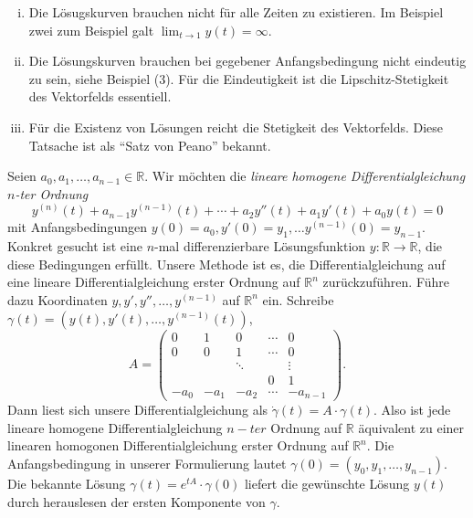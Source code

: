 \documentclass[../main.tex]{subfiles}
\begin{document}
\begin{remarks}
   \leavevmode
   \begin{enumerate}[(i)]
   \item Die Lösugskurven brauchen nicht für alle Zeiten zu existieren.
     Im Beispiel zwei zum Beispiel galt $\lim_{t \to 1} y(t) = \infty$.
   \item Die Lösungskurven brauchen bei gegebener Anfangsbedingung nicht
     eindeutig zu sein, siehe Beispiel (3). Für die
     Eindeutigkeit ist die Lipschitz-Stetigkeit des
     Vektorfelds essentiell.
   \item Für die Existenz von Lösungen reicht
     die Stetigkeit des Vektorfelds. Diese Tatsache
     ist als ``Satz von Peano'' bekannt.
 \end{enumerate}
\end{remarks}

Seien $a_0, a_1, \dots, a_{n-1} \in \mathbb{R}$.
Wir möchten die 
\emph{lineare homogene Differentialgleichung $n$-ter Ordnung}
\[
  y^{(n)}(t) 
  + a_{n-1}y^{(n-1)}(t) 
  + \cdots 
  + a_2 y''(t) 
  + a_1 y'(t) 
  + a_0 y(t) 
  = 0
\]
mit Anfangsbedingungen $y(0) = a_0, y'(0) = y_1, \dots
y^{(n-1)}(0) = y_{n-1}$.
Konkret gesucht ist eine $n$-mal differenzierbare
Lösungsfunktion $y \colon \mathbb{R} \to \mathbb{R}$, 
die diese Bedingungen erfüllt.
Unsere Methode ist es, die Differentialgleichung auf eine
lineare Differentialgleichung erster Ordnung auf $\mathbb{R}^n$ 
zurückzuführen.
Führe dazu Koordinaten
$y, y', y'', \dots, y^{(n-1)}$ auf $\mathbb{R}^n$ ein.
Schreibe
$\gamma(t) = (y(t), y'(t), \dots, y^{(n-1)}(t))$,
\[
  A =
  \begin{pmatrix}
    0 & 1 & 0 & \cdots & 0 \\
    0 & 0 & 1 & \cdots & 0 \\
      &   & \ddots & & \vdots \\
      & & &  0 & 1 \\
    -a_0 & -a_1 & -a_2 & \cdots & -a_{n-1}
  \end{pmatrix}.
\]
Dann liest sich unsere Differentialgleichung als
$\dot \gamma(t) = A \cdot \gamma(t)$.
Also ist jede lineare homogene Differentialgleichung
$n-ter$ Ordnung auf $\mathbb{R}$ äquivalent zu einer linearen
homogonen Differentialgleichung erster Ordnung auf $\mathbb{R}^n$.
Die Anfangsbedingung in unserer Formulierung lautet
$\gamma(0) = (y_0, y_1, \dots, y_{n-1})$.
Die bekannte Lösung $\gamma(t) = e^{tA} \cdot \gamma(0)$ 
liefert die gewünschte Lösung $y(t)$ durch herauslesen
der ersten Komponente von $\gamma$.
\end{document}
